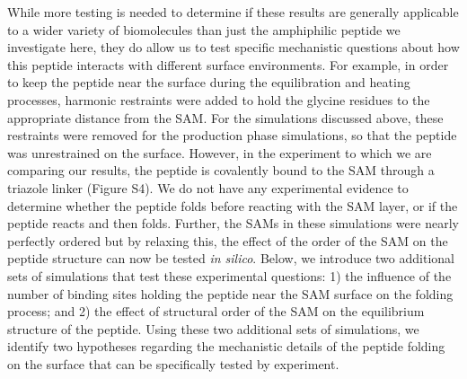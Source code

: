 While more testing is needed to determine if these results are generally applicable to a wider variety of biomolecules than just the amphiphilic peptide we investigate here, they do allow us to test specific mechanistic questions about how this peptide interacts with different surface environments. For example, in order to keep the peptide near the surface during the equilibration and heating processes, harmonic restraints were added to hold the glycine residues to the appropriate distance from the SAM. For the simulations discussed above, these restraints were removed for the production phase simulations, so that the peptide was unrestrained on the surface. However, in the experiment to which we are comparing our results, the peptide is covalently bound to the SAM through a triazole linker (Figure S4). We do not have any experimental evidence to determine whether the peptide folds before reacting with the SAM layer, or if the peptide reacts and then folds. Further, the SAMs in these simulations were nearly perfectly ordered but by relaxing this, the effect of the order of the SAM on the peptide structure can now be tested \emph{in silico}. Below, we introduce two additional sets of simulations that test these experimental questions: 1) the influence of the number of binding sites holding the peptide near the SAM surface on the folding process; and 2) the effect of structural order of the SAM on the equilibrium structure of the peptide. Using these two additional sets of simulations, we identify two hypotheses regarding the mechanistic details of the peptide folding on the surface that can be specifically tested by experiment.
